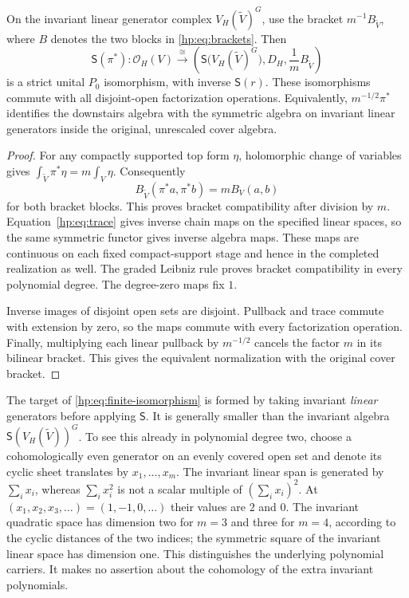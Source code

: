 \begin{proposition}\label{hp:prop:finite}
On the invariant linear generator complex
$V_H(\widetilde V)^G$, use the bracket
$m^{-1}B_{\widetilde V}$, where $B$ denotes the two blocks in
\eqref{hp:eq:brackets}. Then
\begin{equation}\label{hp:eq:finite-isomorphism}
 \mathsf S(\pi^*):\mathcal O_H(V)
 \xrightarrow{\ \cong\ }
 \left(\mathsf S\bigl(V_H(\widetilde V)^G\bigr),
             D_H,\frac1m B_{\widetilde V}\right)
\end{equation}
is a strict unital $P_0$ isomorphism, with inverse $\mathsf S(r)$.
These isomorphisms commute with all disjoint-open factorization
operations. Equivalently, $m^{-1/2}\pi^*$ identifies the downstairs
algebra with the symmetric algebra on invariant linear generators
inside the original, unrescaled cover algebra.
\end{proposition}

\begin{proof}
For any compactly supported top form $\eta$, holomorphic change of
variables gives
$\int_{\widetilde V}\pi^*\eta=m\int_V\eta$.
Consequently
\[
 B_{\widetilde V}(\pi^*a,\pi^*b)=m B_V(a,b)
\]
for both bracket blocks. This proves bracket compatibility after
division by $m$. Equation~\eqref{hp:eq:trace} gives inverse chain
maps on the specified linear spaces, so the same symmetric functor
gives inverse algebra maps. These maps are continuous on each
fixed compact-support stage and hence in the completed realization
as well. The graded Leibniz rule proves bracket compatibility in
every polynomial degree. The degree-zero maps fix $1$.

Inverse images of disjoint open sets are disjoint. Pullback and
trace commute with extension by zero, so the maps commute with
every factorization operation. Finally, multiplying each linear
pullback by $m^{-1/2}$ cancels the factor $m$ in its bilinear
bracket. This gives the equivalent normalization with the original
cover bracket.
\end{proof}

The target of \eqref{hp:eq:finite-isomorphism} is formed by taking
invariant \emph{linear} generators before applying $\mathsf S$.
It is generally smaller than the invariant algebra
$\mathsf S(V_H(\widetilde V))^G$. To see this already in polynomial
degree two, choose a cohomologically even generator on an evenly covered open set
and denote its cyclic sheet translates by $x_1,\ldots,x_m$.
The invariant linear span is generated by $\sum_i x_i$, whereas
$\sum_i x_i^2$ is not a scalar multiple of $(\sum_i x_i)^2$.
At $(x_1,x_2,x_3,\ldots)=(1,-1,0,\ldots)$ their values are $2$
and $0$. The invariant quadratic space has dimension two for
$m=3$ and three for $m=4$, according to the cyclic distances of
the two indices; the symmetric square of the invariant linear
space has dimension one. This distinguishes the underlying
polynomial carriers. It makes no assertion about the cohomology
of the extra invariant polynomials.


